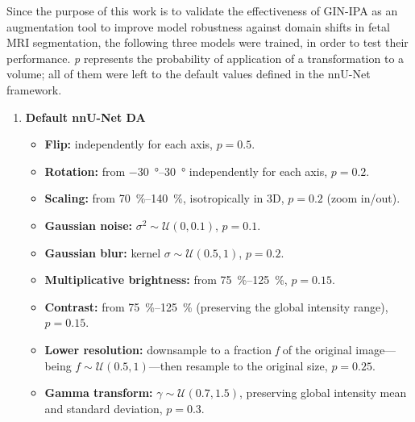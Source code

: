 Since the purpose of this work is to validate the effectiveness of GIN-IPA as an augmentation tool to improve model robustness against domain shifts in fetal MRI segmentation, the following three models were trained, in order to test their performance. \textit{p} represents the probability of application of a transformation to a volume; all of them were left to the default values defined in the nnU-Net framework.
\begin{enumerate}

    \item \textbf{Default nnU-Net DA}
    \begin{itemize}
        \item \textbf{Flip:} independently for each axis, $p=0.5$.
        \item \textbf{Rotation:} from \qtyrange{-30}{30}{\degree} independently for each axis, $p=0.2$.
        \item \textbf{Scaling:} from \qtyrange{70}{140}{\percent}, isotropically in 3D, $p=0.2$ (zoom in/out).
        \item \textbf{Gaussian noise:} $\sigma^2 \sim \mathcal{U}(0, 0.1)$, $p=0.1$.
        \item \textbf{Gaussian blur:} kernel $\sigma \sim \mathcal{U}(0.5, 1)$, $p=0.2$.
        \item \textbf{Multiplicative brightness:} from \qtyrange{75}{125}{\percent}, $p=0.15$.
        \item \textbf{Contrast:} from \qtyrange{75}{125}{\percent} (preserving the global intensity range), $p=0.15$.
        \item \textbf{Lower resolution:} downsample to a fraction \textit{f} of the original image---being $f \sim \mathcal{U}(0.5, 1)$---then resample to the original size, $p=0.25$.
        \item \textbf{Gamma transform:} $\gamma \sim \mathcal{U}(0.7, 1.5)$, preserving global intensity mean and standard deviation, $p=0.3$.
    \end{itemize}


\end{enumerate}
